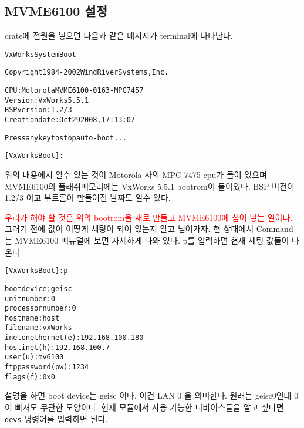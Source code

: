 \documentclass[11pt,a4paper]{article}
\begin{document}
\subsection{MVME6100 설정}
crate에 전원을 넣으면 다음과 같은 메시지가 terminal에 나타난다.
\begin{framed}
\begin{alltt}
                            VxWorks System Boot


Copyright 1984-2002  Wind River Systems, Inc.



CPU: Motorola MVME6100-0163 - MPC 7457
Version: VxWorks5.5.1
BSP version: 1.2/3
Creation date: Oct 29 2008, 17:13:07


Press any key to stop auto-boot...

[VxWorks Boot]:

\end{alltt}
\end{framed}
위의 내용에서 알수 있는 것이 Motorola 사의 MPC 7475 cpu가 들어 있으며
MVME6100의 플래쉬메모리에는 VxWorks 5.5.1 bootrom이 들어있다.
BSP 버전이 1.2/3 이고 부트롬이 만들어진 날짜도 알수 있다.

\textcolor{red}{우리가 해야 할 것은 위의 bootrom을 새로 만들고 MVME6100에 심어 넣는 일이다.}
그러기 전에 값이 어떻게 세팅이 되어 있는지 알고 넘어가자. 현 상태에서 Command 는 
MVME6100 메뉴얼에 보면 자세하게 나와 있다. p를 입력하면 현재 세팅 값들이 나온다.

\begin{framed}
\begin{alltt}
[VxWorks Boot]: p

boot device          : geisc
unit number          : 0 
processor number     : 0 
host name            : host
file name            : vxWorks
inet on ethernet (e) : 192.168.100.180
host inet (h)        : 192.168.100.7
user (u)             : mv6100
ftp password (pw)    : 1234
flags (f)            : 0x0 
\end{alltt}
\end{framed}

설명을 하면 boot device는 geisc 이다. 이건 LAN 0 을 의미한다. 
원래는 geisc0인데 0이 빠져도 무관한 모양이다. 현재 모듈에서 사용 가능한 디바이스들을 알고 싶다면
\verb|devs| 명령어를 입력하면 된다.
\end{document}
